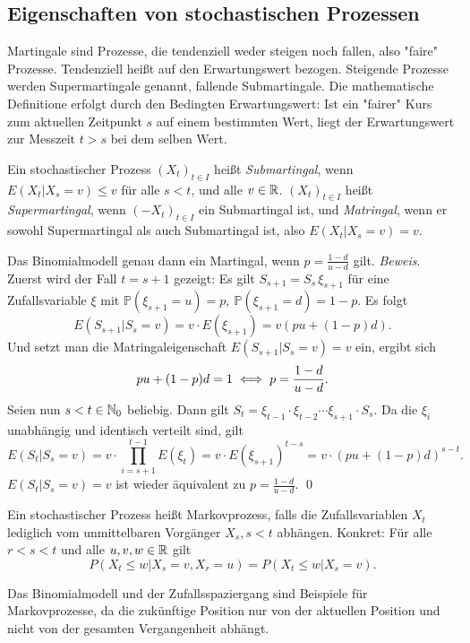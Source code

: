 \subsection{Eigenschaften von stochastischen Prozessen}

\begin{defi}[Martingal]
Martingale sind Prozesse, die tendenziell weder steigen noch fallen, 
also "faire" Prozesse. Tendenziell heißt auf den Erwartungswert bezogen. 
Steigende Prozesse werden Supermartingale genannt, fallende Submartingale. 
Die mathematische Definitione erfolgt durch den Bedingten Erwartungswert: 
Ist ein "fairer" Kurs zum aktuellen Zeitpunkt $s$ auf einem bestimmten Wert, 
liegt der Erwartungswert zur Messzeit $t \gt s$ bei dem selben Wert.

Ein stochastischer Prozess $(X_t)_{t \in I}$ heißt \textit{Submartingal}, wenn 
$E(X_t|X_s=v) \le v$  für alle $s \lt t$, und alle $v \in \Bbb R$. $(X_t)_{t \in I}$
 heißt \textit{Supermartingal}, wenn  $(-X_t)_{t \in I}$ ein Submartingal ist, und \textit{Matringal}, 
 wenn er sowohl Supermartingal als auch Submartingal ist, also $E(X_t|X_s=v) = v$.
\end{defi}

\begin{lemma}
Das Binomialmodell genau dann ein Martingal, wenn $p=\frac{1-d}{u-d}$ gilt. 
\textit{Beweis}.
Zuerst wird der Fall $t = s + 1$ gezeigt:
Es gilt $S_{s+1}=S_s\,\xi_{s+1}$ für eine Zufallsvariable $\xi$ mit $\mathbb{P}(\xi_{s+1}=u)=p,\ \mathbb{P}(\xi_{s+1}=d)=1-p$. Es folgt
$$E(S_{s+1}|S_s=v)= v \cdot E(\xi_{s+1})=v(pu+(1-p)d).$$
Und setzt man die Matringaleigenschaft $E(S_{s+1}|S_s=v)=v$ ein, ergibt sich
$$pu+(1-p)d=1\\[6pt] \iff p=\frac{1-d}{u-d}.$$
Seien nun $s < t \in \Bbb N_0$ beliebig. Dann gilt $S_t=\xi_{t-1}\cdot \xi_{t-2}\cdots \xi_{s+1}\cdot S_s$. Da die $\xi_i$ unabhängig und identisch verteilt sind, gilt
$$E(S_t|S_s=v)=v \cdot \prod_{i=s+1}^{t-1} E(\xi_t)=v \cdot E(\xi_{s+1})^{t-s}=v \cdot (pu+(1-p)d)^{s-t}.$$
$E(S_t|S_s=v)=v$ ist wieder äquivalent zu $p=\frac{1-d}{u-d}$. \qed
\end{lemma}

\begin{defi}[Markovprozess]
Ein stochastischer Prozess heißt Markovprozess, falls die 
Zufallsvariablen $X_t$ lediglich vom unmittelbaren Vorgänger $X_s, s \lt t$ abhängen.
Konkret: Für alle $r \lt s \lt t$ und alle $u, v, w \in \Bbb R$ gilt
$$P(X_t \le w | X_s = v, X_r=u) = P(X_t \le w|X_s=v).$$
\end{defi}

\begin{bsp}
Das Binomialmodell und der Zufallsspaziergang sind Beispiele für Markovprozesse, da die zukünftige Position 
nur von der aktuellen Position und nicht von der gesamten Vergangenheit abhängt.
\end{bsp}